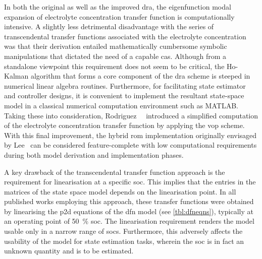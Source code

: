 

In both the original as well  as the improved \gls{dra}, the eigenfunction modal
expansion  of electrolyte  concentration  transfer  function is  computationally
intensive.  A  slightly  less  detrimental   disadvantage  with  the  series  of
transcendental transfer functions associated  with the electrolyte concentration
was   that  their   derivation  entailed   mathematically  cumbersome   symbolic
manipulations that  dictated the need  of a  capable \gls{cas}. Although  from a
standalone  viewpoint  this  requirement  does  not seem  to  be  critical,  the
\mbox{Ho-Kalman}  algorithm  that  forms  a  core  component  of  the  \gls{dra}
scheme  is  steeped  in  numerical linear  algebra  routines.  Furthermore,  for
facilitating  state  estimator  and  controller designs,  it  is  convenient  to
implement the resultant  state-space model in a  classical numerical computation
environment   such  as   \textsc{MATLAB}.  Taking   these  into   consideration,
Rodriguez~\etal{}~\cite{Rodriguez2017}  introduced a  simplified computation  of
the  electrolyte  concentration  transfer  function by  applying  the  \gls{vop}
scheme.  With  this  final  improvement,  the  hybrid  \gls{rom}  implementation
originally envisaged by Lee~\etal{} can  be considered feature-complete with low
computational  requirements  during  both model  derivation  and  implementation
phases.


A  key  drawback  of  the  transcendental  transfer  function  approach  is  the
requirement for  linearisation at  a specific \gls{soc}.  This implies  that the
entries in  the matrices of the  state space model depends  on the linearisation
point. In all published works  employing this approach, these transfer functions
were  obtained by  linearising the  \gls{p2d} equations  of the  \gls{dfn} model
(see \cref{tbl:dfneqns}), typically  at an operating point  of \SI{50}{\percent}
\gls{soc}.  The linearisation  requirement renders  the model  usable only  in a
narrow range of  \glspl{soc}. Furthermore, this adversely  affects the usability
of the  model for state  estimation tasks, wherein the  \gls{soc} is in  fact an
unknown quantity and is to be estimated.


